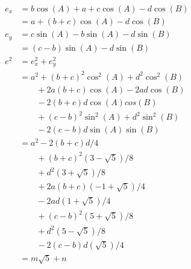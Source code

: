 \begin{align*}
e_x &= b\cos(A) + a + c\cos(A) - d\cos(B) \\
      &= a + (b + c)\cos(A) - d\cos(B) \\

e_y &= c\sin(A) - b\sin(A) - d\sin(B) \\
      &= (c - b)\sin(A) - d\sin(B) 
\\
e^2 &= e_x^2 + e_y^2 \\
    &= a^2 + (b + c)^2\cos^2(A) + d^2\cos^2(B) \\
    &\qquad + 2a(b + c)\cos(A) - 2ad\cos(B) \\
    &\qquad - 2(b + c)d\cos(A)cos(B) \\
    &\qquad + (c - b)^2\sin^2(A) + d^2\sin^2(B) \\
    &\qquad - 2(c - b)d\sin(A)\sin(B) \\
    &= a^2 - 2(b + c)d / 4 \\
    &\qquad + (b + c)^2 ( 3 - \sqrt{5}) / 8 \\
    &\qquad + d^2       ( 3 + \sqrt{5}) / 8 \\
    &\qquad + 2a(b + c) (-1 + \sqrt{5}) / 4 \\
    &\qquad - 2ad( 1 + \sqrt{5}) / 4 \\
    &\qquad + (c - b)^2 ( 5 + \sqrt{5}) / 8 \\
    &\qquad + d^2       ( 5 - \sqrt{5}) / 8 \\
    &\qquad - 2(c - b)d ( \sqrt{5}) / 4 \\
    &= m\sqrt{5} + n \\
\end{align*}